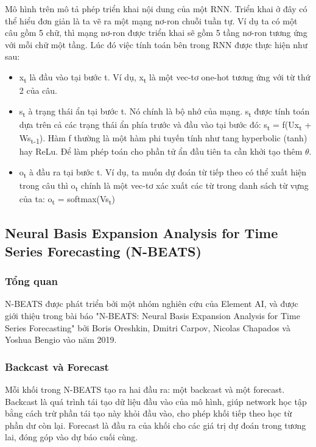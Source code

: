 \documentclass[conference]{IEEEtran}
\begin{document}
Mô hình trên mô tả phép triển khai nội dung của một RNN. Triển khai ở đây có thể hiểu đơn giản là ta vẽ ra một mạng nơ-ron chuỗi tuần tự. Ví dụ ta có một câu gồm 5 chữ, thì mạng nơ-ron được triển khai sẽ gồm 5 tầng nơ-ron tương ứng với mỗi chữ một tầng. Lúc đó việc tính toán bên trong RNN được thực hiện như sau:
\begin{itemize}
    \item x\textsubscript{t} là đầu vào tại bước t. Ví dụ, x\textsubscript{t} là một vec-tơ one-hot tương ứng với từ thứ 2 của câu.
    \item s\textsubscript{t} à trạng thái ẩn tại bước t. Nó chính là bộ nhớ của mạng. s\textsubscript{t} được tính toán dựa trên cả các trạng thái ẩn phía trước và đầu vào tại bước đó: s\textsubscript{t} = f(Ux\textsubscript{t} +  Ws\textsubscript{t-1}). Hàm f thường là một hàm phi tuyến tính như tang hyperbolic (tanh) hay ReLu. Để làm phép toán cho phần tử ẩn đầu tiên ta cần khởi tạo thêm \(\theta \).
    \item o\textsubscript{t} à đầu ra tại bước t. Ví dụ, ta muốn dự đoán từ tiếp theo có thể xuất hiện trong câu thì o\textsubscript{t} chính là một vec-tơ xác xuất các từ trong danh sách từ vựng của ta: o\textsubscript{t} = softmax(Vs\textsubscript{t})
\end{itemize}

\subsection{Neural Basis Expansion Analysis for Time Series Forecasting (N-BEATS)}
\vspace{1mm}
\subsubsection{Tổng quan}
N-BEATS được phát triển bởi một nhóm nghiên cứu của Element AI, và được giới thiệu trong bài báo "N-BEATS: Neural Basis Expansion Analysis for Time Series Forecasting" bởi Boris Oreshkin, Dmitri Carpov, Nicolas Chapados và Yoshua Bengio vào năm 2019.
\vspace{3mm}
\subsubsection{Backcast và Forecast}
Mỗi khối trong N-BEATS tạo ra hai đầu ra: một backcast và một forecast. Backcast là quá trình tái tạo dữ liệu đầu vào của mô hình, giúp network học tập bằng cách trừ phần tái tạo này khỏi đầu vào, cho phép khối tiếp theo học từ phần dư còn lại. Forecast là đầu ra của khối cho các giá trị dự đoán trong tương lai, đóng góp vào dự báo cuối cùng.
\vspace{3mm}
\end{document}
